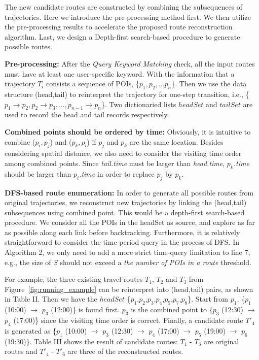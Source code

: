 The new candidate routes are constructed by combining the subsequences of trajectories. Here we introduce the pre-processing method first. We then utilize the pre-processing results to accelerate the proposed route reconstruction algorithm. Last, we design a Depth-first search-based procedure to generate possible routes.

 \textbf{Pre-processing:} After the \textit{Query Keyword Matching} check, all the input routes must have at least one user-specific keyword. With the information that a trajectory $T_{i}$ consists a sequence of POIs, \{$p_{1},p_{2},...p_{n}$\}. Then we use the data structure (head,tail) to reinterpret the trajectory for one-step transition, i.e., \{$p_{1}\rightarrow p_{2},p_{2}\rightarrow p_{3},...,p_{n-1}\rightarrow p_{n}$\}. Two dictionaried lists $headSet$ and $tailSet$ are used to record the head and tail records respectively.
 
 \textbf{Combined points should be ordered by time:} Obviously, it is intuitive to combine ($p_{i},p_{j}$) and ($p_{k},p_{l}$) if $p_{j}$ and $p_{k}$ are the same location. Besides considering spatial distance, we also need to consider the visiting time order among combined points. Since \textit{tail.time} must be larger than \textit{head.time}, \textit{$p_k$.time} should be larger than \textit{$p_i$.time} in order to replace $p_j$ by $p_k$.
 
 \textbf{DFS-based route enumeration:} In order to generate all possible routes from original trajectories, we reconstruct new trajectories by linking the (head,tail) subsequences using combined point. This would be a depth-first search-based procedure. We consider all the POIs in the headSet as source, and explore as far as possible along each link before backtracking. Furthermore, it is relatively straightforward to consider the time-period query in the process of DFS. In Algorithm 2, we only need to add a more strict time-query limitation to line 7, e.g., the size of $S$ should not exceed a \textit{the number of POIs in a route} threshold.


For example, the three existing travel routes $T_{1}$, $T_{2}$ and $T_{3}$ from Figure~\ref{fig:running_example} can be reinterpret into (head,tail) pairs, as shown in Table II. Then we have the $headSet$ \{$p_1$,$p_2$,$p_3$,$p_4$,$p_5$,$p_7$,$p_8$\}. Start from $p_1$, \{$p_1$ (10:00) $\rightarrow$ $p_3$ (12:00)\} is found first. $p_3$ is the combined point to \{$p_3$ (12:30) $\rightarrow$ $p_4$ (17:00)\} since the visiting time order is correct. Finally, a candidate route $T'_4$ is generated as \{$p_{1}$ (10:00) $\rightarrow$ $p_{3}$ (12:30) $\rightarrow$ $p_{4}$ (17:00) $\rightarrow$ $p_{5}$ (19:00) $\rightarrow$ $p_{6}$ (19:30)\}. Table III shows the result of candidate routes: $T_1$ - $T_3$ are original routes and $T'_4$ - $T'_6$ are three of the reconstructed routes. 

